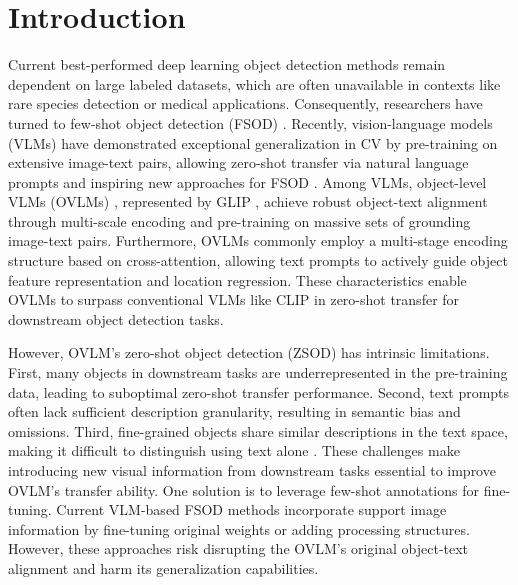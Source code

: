 \documentclass[10pt,twocolumn,letterpaper]{article}
\begin{document}
\section{Introduction}
Current best-performed deep learning object detection methods \cite{redmon2016you,ren2016faster} remain dependent on large labeled datasets, which are often unavailable in contexts like rare species detection or medical applications. Consequently, researchers have turned to few-shot object detection (FSOD) \cite{Bulat_2023fsdetr, Han_2024_FM-FSOD, wang2019metadet, Qiao_2021_defrcn2, han2022fct}. Recently, vision-language models (VLMs) have demonstrated exceptional generalization in CV by pre-training on extensive image-text pairs, allowing zero-shot transfer via natural language prompts and inspiring new approaches for FSOD \cite{guo2024DP-DDCL, han2022mmfsod, xu2023normvae, zhao2024veic, li2023dr, Han_2024_FM-FSOD}. Among VLMs, object-level VLMs (OVLMs) \cite{li2022glip, dou2022fiber, liu2023groundingdino}, represented by GLIP \cite{li2022glip}, achieve robust object-text alignment through multi-scale encoding and pre-training on massive sets of grounding image-text pairs. Furthermore, OVLMs commonly employ a multi-stage encoding structure based on cross-attention, allowing text prompts to actively guide object feature representation and location regression. These characteristics enable OVLMs to surpass conventional VLMs like CLIP \cite{radford2021clip} in zero-shot transfer for downstream object detection tasks. %

However, OVLM's zero-shot object detection (ZSOD) has intrinsic limitations. First, many objects in downstream tasks are underrepresented in the pre-training data, leading to suboptimal zero-shot transfer performance. Second, text prompts often lack sufficient description granularity, resulting in semantic bias and omissions. Third, fine-grained objects share similar descriptions in the text space, making it difficult to distinguish using text alone \cite{xu2023mqdet,du2022learning}. These challenges make introducing new visual information from downstream tasks essential to improve OVLM's transfer ability. One solution is to leverage few-shot annotations for fine-tuning. Current VLM-based FSOD methods incorporate support image information by fine-tuning original weights or adding processing structures. However, these approaches risk disrupting the OVLM's original object-text alignment and harm its generalization capabilities.
\end{document}
